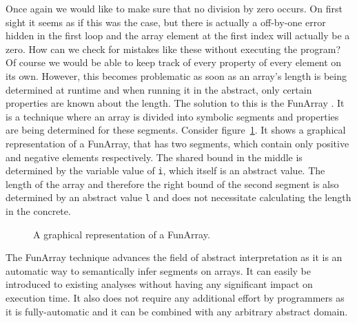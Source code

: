 \noindent Once again we would like to make sure that no division by zero occurs. On first sight it seems as if this was the case, but there is actually a off-by-one error hidden in the first loop and the array element at the first index will actually be a zero.
How can we check for mistakes like these without executing the program? Of course we would be able to keep track of every property of every element on its own. However, this becomes problematic as soon as an array's length is being determined at runtime and when running it in the abstract, only certain properties are known about the length. The solution to this is the FunArray \cite{cousot2011}. It is a technique where an array is divided into symbolic segments and properties are being determined for these segments. Consider figure~\ref{fig:funarray}. It shows a graphical representation of a FunArray, that has two segments, which contain only positive and negative elements respectively. The shared bound in the middle is determined by the variable value of \texttt{i}, which itself is an abstract value. The length of the array and therefore the right bound of the second segment is also determined by an abstract value \texttt{l} and does not necessitate calculating the length in the concrete.

\begin{figure}[!htb]
\vspace{0.2cm}
\begin{center}
\end{center}
\caption{A graphical representation of a FunArray.} \label{fig:funarray}

\end{figure}

\noindent The FunArray technique advances the field of abstract interpretation as it is an automatic way to semantically infer segments on arrays. It can easily be introduced to existing analyses without having any significant impact on execution time. It also does not require any additional effort by programmers as it is fully-automatic and it can be combined with any arbitrary abstract domain. 


